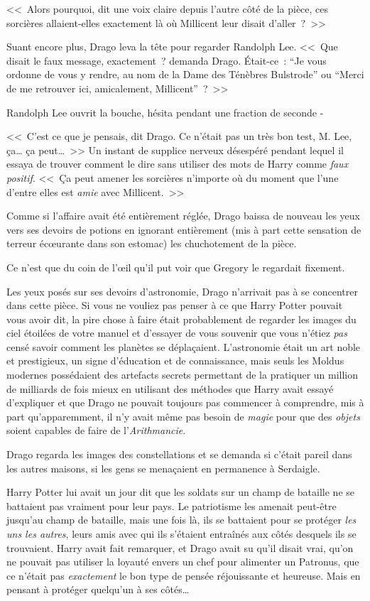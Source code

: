 <<~Alors pourquoi, dit une voix claire depuis l'autre côté de la pièce, ces sorcières allaient-elles exactement là où Millicent leur disait d'aller~?~>>

Suant encore plus, Drago leva la tête pour regarder Randolph Lee. <<~Que disait le faux message, exactement~? demanda Drago. Était-ce~: “Je vous ordonne de vous y rendre, au nom de la Dame des Ténèbres Bulstrode” ou “Merci de me retrouver ici, amicalement, Millicent”~?~>>

Randolph Lee ouvrit la bouche, hésita pendant une fraction de seconde -

<<~C'est ce que je pensais, dit Drago. Ce n'était pas un très bon test, M. Lee, ça… ça peut…~>> Un instant de supplice nerveux désespéré pendant lequel il essaya de trouver comment le dire sans utiliser des mots de Harry comme \emph{faux positif}. <<~Ça peut amener les sorcières n'importe où du moment que l'une d'entre elles est \emph{amie} avec Millicent.~>>

Comme si l'affaire avait été entièrement réglée, Drago baissa de nouveau les yeux vers ses devoirs de potions en ignorant entièrement (mis à part cette sensation de terreur écœurante dans son estomac) les chuchotement de la pièce.

Ce n'est que du coin de l'œil qu'il put voir que Gregory le regardait fixement.

\later

Les yeux posés sur ses devoirs d'astronomie, Drago n'arrivait pas à se concentrer dans cette pièce. Si vous ne vouliez pas penser à ce que Harry Potter pouvait vous avoir dit, la pire chose à faire était probablement de regarder les images du ciel étoilées de votre manuel et d'essayer de vous souvenir que vous n'étiez \emph{pas} censé savoir comment les planètes se déplaçaient. L'astronomie était un art noble et prestigieux, un signe d'éducation et de connaissance, mais seuls les Moldus modernes possédaient des artefacts secrets permettant de la pratiquer un million de milliards de fois mieux en utilisant des méthodes que Harry avait essayé d'expliquer et que Drago ne pouvait toujours pas commencer à comprendre, mis à part qu'apparemment, il n'y avait même pas besoin de \emph{magie} pour que des \emph{objets} soient capables de faire de l'\emph{Arithmancie}.

Drago regarda les images des constellations et se demanda si c'était pareil dans les autres maisons, si les gens se menaçaient en permanence à Serdaigle.

Harry Potter lui avait un jour dit que les soldats sur un champ de bataille ne se battaient pas vraiment pour leur pays. Le patriotisme les amenait peut-être jusqu'au champ de bataille, mais une fois là, ils se battaient pour se protéger \emph{les uns les autres}, leurs amis avec qui ils s'étaient entraînés aux côtés desquels ils se trouvaient. Harry avait fait remarquer, et Drago avait su qu'il disait vrai, qu'on ne pouvait pas utiliser la loyauté envers un chef pour alimenter un Patronus, que ce n'était pas \emph{exactement} le bon type de pensée réjouissante et heureuse. Mais en pensant à protéger quelqu'un à ses côtés…

